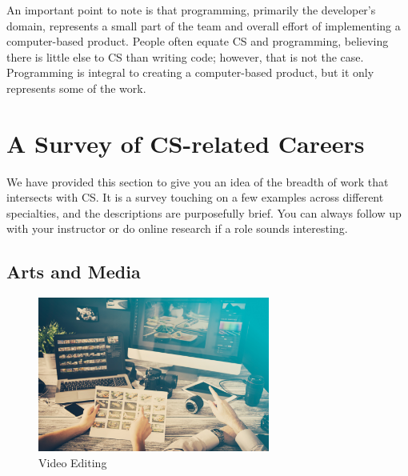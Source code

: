 An important point to note is that programming, primarily the developer's domain, represents a small part of the team and overall effort of implementing a computer-based product. People often equate CS and programming, believing there is little else to CS than writing code; however, that is not the case. Programming is integral to creating a computer-based product, but it only represents some of the work.

\newpage

\section{A Survey of CS-related Careers}

We have provided this section to give you an idea of the breadth of work that intersects with CS. It is a survey touching on a few examples across different specialties, and the descriptions are purposefully brief. You can always follow up with your instructor or do online research if a role sounds interesting.

\subsection{Arts and Media}

\begin{figure}[H]
	\begin{center}
		\caption{Video Editing}
		\vskip 4pt
		\includegraphics[height=2in]{images/careers/iStock-922654000.small.jpg}
	\end{center}
\end{figure}

